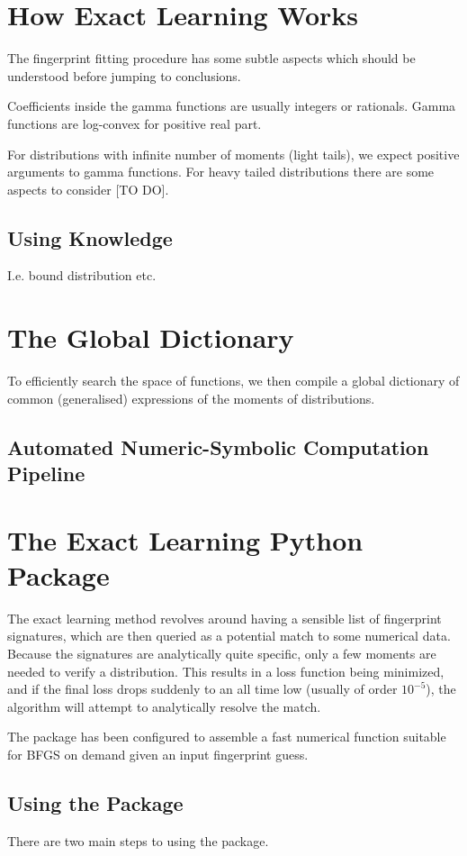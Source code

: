 \documentclass{article}
\begin{document}
\section{How Exact Learning Works}
The fingerprint fitting procedure has some subtle aspects which should be understood before jumping to conclusions.


Coefficients inside the gamma functions are usually integers or rationals.
Gamma functions are log-convex for positive real part.

For distributions with infinite number of moments (light tails), we expect positive arguments to gamma functions. For heavy tailed distributions there are some aspects to consider [TO DO].


\subsection{Using Knowledge}
I.e. bound distribution etc.


\section{The Global Dictionary}
To efficiently search the space of functions, we then compile a global dictionary of common (generalised) expressions of the moments of distributions. 


\subsection{Automated Numeric-Symbolic Computation Pipeline}

\section{The Exact Learning Python Package}
The exact learning method revolves around having a sensible list of fingerprint signatures, which are then queried as a potential match to some numerical data. Because the signatures are analytically quite specific, only a few moments are needed to verify a distribution. This results in a loss function being minimized, and if the final loss drops suddenly to an all time low (usually of order $10^{-5}$), the algorithm will attempt to analytically resolve the match. 

The package has been configured to assemble a fast numerical function suitable for BFGS on demand given an input fingerprint guess.

\subsection{Using the Package}
There are two main steps to using the package.
\end{document}
